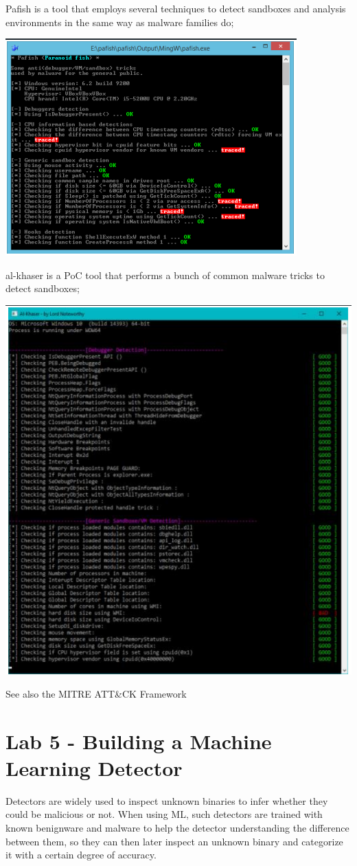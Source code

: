 \documentclass[]{project_plan}
\begin{document}
Pafish is a tool that employs several techniques to detect sandboxes and analysis
environments in the same way as malware families do;

\includegraphics[width=.7\linewidth]{pafish}

al-khaser is a PoC tool that performs a bunch of common malware tricks to detect sandboxes;

\includegraphics[width=.7\linewidth]{alkhaser.png}

See also the MITRE ATT\&CK Framework

\chapter{Lab 5 - Building a Machine Learning Detector}

Detectors are widely used to inspect unknown binaries to infer whether they
could be malicious or not. When using ML, such detectors are trained with
known benignware and malware to help the detector understanding the difference
between them, so they can then later inspect an unknown binary and
categorize it with a certain degree of accuracy.
\end{document}
